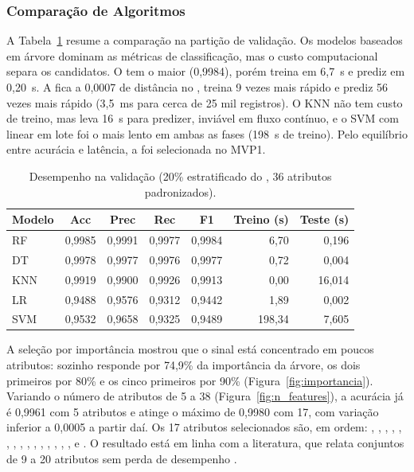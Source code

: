 \subsubsection{Comparação de Algoritmos}

A Tabela~\ref{tab:mvp1} resume a comparação na partição de validação. Os modelos
baseados em árvore dominam as métricas de classificação, mas o custo
computacional separa os candidatos. O  tem o maior
 (0,9984), porém treina em 6,7~s e prediz em 0,20~s. A
 fica a 0,0007 de distância no , treina 9 vezes mais
rápido e prediz 56 vezes mais rápido (3,5~ms para cerca de 25 mil registros). O KNN
não tem custo de treino, mas leva 16~s para predizer, inviável em fluxo contínuo,
e o SVM com  linear em lote foi o mais lento em ambas as fases (198~s de
treino). Pelo equilíbrio entre acurácia e latência, a  foi
selecionada no MVP1.

\begin{table}[H]
\centering
\footnotesize
\setlength{\tabcolsep}{2.5pt}
\begin{tabular}{l c c c c r r}
\toprule
\textbf{Modelo} & \textbf{Acc} & \textbf{Prec} & \textbf{Rec} & \textbf{F1} & \textbf{Treino (s)} & \textbf{Teste (s)} \\
\midrule
RF  & 0,9985 & 0,9991 & 0,9977 & 0,9984 &   6,70 &  0,196 \\
DT  & 0,9978 & 0,9977 & 0,9976 & 0,9977 &   0,72 &  0,004 \\
KNN & 0,9919 & 0,9900 & 0,9926 & 0,9913 &   0,00 & 16,014 \\
LR  & 0,9488 & 0,9576 & 0,9312 & 0,9442 &   1,89 &  0,002 \\
SVM & 0,9532 & 0,9658 & 0,9325 & 0,9489 & 198,34 &  7,605 \\
\bottomrule
\end{tabular}
\caption{Desempenho na validação (20\% estratificado do , 36 atributos padronizados).}
\label{tab:mvp1}
\end{table}

A seleção por importância mostrou que o sinal está concentrado em poucos
atributos:  sozinho responde por 74,9\% da importância da árvore,
os dois primeiros por 80\% e os cinco primeiros por 90\%
(Figura~\ref{fig:importancia}). Variando o número de atributos de 5 a 38
(Figura~\ref{fig:n_features}), a acurácia já é 0,9961 com 5 atributos e atinge o
máximo de 0,9980 com 17, com variação inferior a 0,0005 a partir daí. Os
17 atributos selecionados são, em ordem: ,
, , ,
, ,
, , ,
, , ,
, ,
,  e
. O resultado está em linha com a literatura, que
relata conjuntos de 9 a 20 atributos sem perda de desempenho
\cite{Thakkar2021Survey, Othman2018Intrusion, Rathore2016RealTime}.

